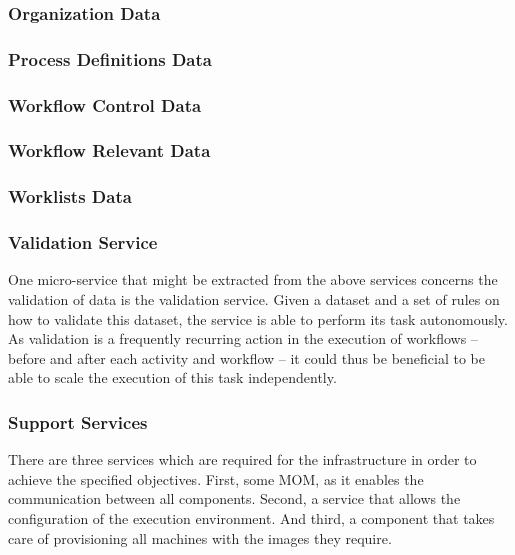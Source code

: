     \subsubsection{Organization Data} %
    \label{subs:organization_data}

    \subsubsection{Process Definitions Data} %
    \label{subs:process_definitions_data}

    \subsubsection{Workflow Control Data} %
    \label{subs:workflow_control_data}

    \subsubsection{Workflow Relevant Data} %
    \label{subs:workflow_relevant_data}

    \subsubsection{Worklists Data} %
    \label{subs:worklists}


  \subsubsection{Validation Service} %
    \label{subs:valitation_service}
    One micro-service that might be extracted from the above services concerns the validation of data is the validation service. Given a dataset and a set of rules on how to validate this dataset, the service is able to perform its task autonomously. As validation is a frequently recurring action in the execution of workflows -- before and after each activity and workflow -- it could thus be beneficial to be able to scale the execution of this task independently.

  \subsubsection{Support Services} %
  \label{ssub:support_components}
    There are three services which are required for the infrastructure in order to achieve the specified objectives. First, some \ac{MOM}, as it enables the communication between all components. Second, a service that allows the configuration of the execution environment. And third, a component that takes care of provisioning all machines with the images they require.

